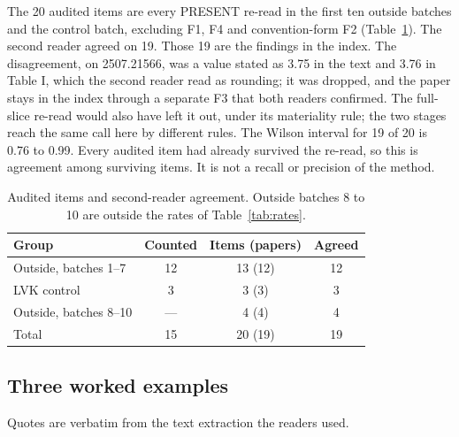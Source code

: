 \documentclass[reprint,amsmath,amssymb,aps,superscriptaddress,nofootinbib]{revtex4-2}
\begin{document}
The 20 audited items are every PRESENT re-read in the first ten outside batches and the control batch, excluding F1, F4 and convention-form F2 (Table~\ref{tab:agree}). The second reader agreed on 19. Those 19 are the findings in the index. The disagreement, on 2507.21566, was a value stated as 3.75 in the text and 3.76 in Table I, which the second reader read as rounding; it was dropped, and the paper stays in the index through a separate F3 that both readers confirmed. The full-slice re-read would also have left it out, under its materiality rule; the two stages reach the same call here by different rules. The Wilson interval for 19 of 20 is 0.76 to 0.99. Every audited item had already survived the re-read, so this is agreement among surviving items. It is not a recall or precision of the method.

\begin{table}[t]
\caption{Audited items and second-reader agreement. Outside batches 8 to 10 are outside the rates of Table~\ref{tab:rates}.}
\label{tab:agree}
\centering\small
\begin{tabular}{lccc}
\hline\hline
Group & Counted & Items (papers) & Agreed \\ \hline
Outside, batches 1--7 & 12 & 13 (12) & 12 \\
LVK control & 3 & 3 (3) & 3 \\
Outside, batches 8--10 & --- & 4 (4) & 4 \\
Total & 15 & 20 (19) & 19 \\
\hline\hline
\end{tabular}
\end{table}

\subsection{Three worked examples}
\label{sec:examples}

Quotes are verbatim from the text extraction the readers used.
\end{document}

